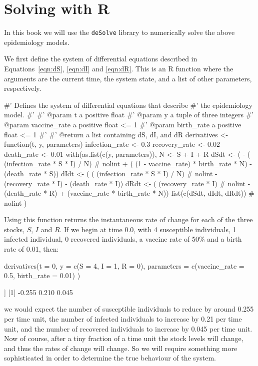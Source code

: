 \section{Solving with R}\label{sec:solving-with-R}
In this book we will use the \texttt{deSolve} library to numerically
solve the above epidemiology models.

We first define the system of differential equations described in
Equations~\ref{eqn:dS}, \ref{eqn:dI} and \ref{eqn:dR}. This is an R function
where the arguments are the current time, the system state, and a list of other
parameters, respectively.

\begin{Rin}
#' Defines the system of differential equations that describe
#' the epidemiology model.
#'
#' @param t a positive float
#' @param y a tuple of three integers
#' @param vaccine_rate a positive float <= 1
#' @param birth_rate a positive float <= 1
#'
#' @return a list containing dS, dI, and dR
derivatives <- function(t, y, parameters){
  infection_rate <- 0.3
  recovery_rate <- 0.02
  death_rate <- 0.01
  with(as.list(c(y, parameters)), {
    N <- S + I + R
    dSdt <- ( - ( (infection_rate * S * I) / N)  # nolint
             + ( (1 - vaccine_rate) * birth_rate * N)
             - (death_rate * S))
    dIdt <- ( ( (infection_rate * S * I) / N)  # nolint
            - (recovery_rate * I)
            - (death_rate * I))
    dRdt <- ( (recovery_rate * I)  # nolint
             - (death_rate * R)
             + (vaccine_rate * birth_rate * N))
    list(c(dSdt, dIdt, dRdt))  # nolint
  })
}
\end{Rin}

Using this function returns the instantaneous rate of change for each of the
three stocks, $S$, $I$ and $R$. If we begin at time 0.0, with 4 susceptible
individuals, 1 infected individual, 0 recovered individuals, a vaccine rate
of 50\% and a birth rate of 0.01, then:

\begin{Rin}
derivatives(t = 0,
            y = c(S = 4, I = 1, R = 0),
            parameters = c(vaccine_rate = 0.5,
                           birth_rate = 0.01)
)
\end{Rin}

\begin{Rout}
[[1]]
[1] -0.255  0.210  0.045

\end{Rout}

we would expect the number of susceptible individuals to reduce by around 0.255
per time unit, the number of infected individuals to increase by 0.21 per time
unit, and the number of recovered individuals to increase by 0.045 per time
unit. Now of course, after a tiny fraction of a time unit the stock levels will
change, and thus the rates of change will change. So we will require something
more sophisticated in order to determine the true behaviour of the system.


